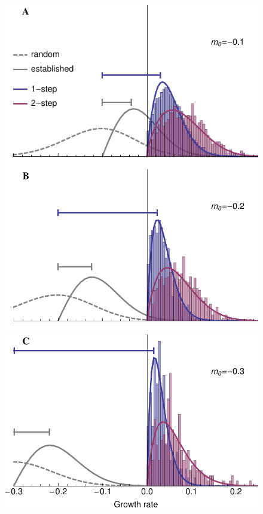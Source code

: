 \documentclass[9pt,twocolumn,twoside,lineno]{gsajnl}
\begin{document}
\begin{figure}[htbp]
\centering
\includegraphics[width=\linewidth]{../IMAGES/2step_m2_smallm0_sims.pdf}\\
\includegraphics[width=\linewidth]{../IMAGES/2step_m2_medm0_sims.pdf}\\
\includegraphics[width=\linewidth]{../IMAGES/2step_m2_largem0_sims.pdf}

\end{figure}
\end{document}
